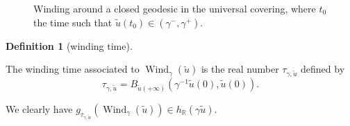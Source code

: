 \documentclass[a4paper,english,reqno]{amsart}
\newcommand{\R}{\mathbb{R}}
\theoremstyle{definition}
\newtheorem{definition}[theorem]{Definition}
\numberwithin{equation}{section}
\begin{document}
	\begin{figure}[htbp]
	\centering
	\begin{normalsize} 
		\def\svgwidth{13cm}
		dessin12.pdf_tex}
	\end{normalsize}
	\caption{Winding around a closed geodesic in the universal covering, where $t_0$ the time such that $\tilde u(t_0)\in (\gamma^-,\gamma^+)$.}
	\label{dessin12}
\end{figure}


\begin{definition}[winding time]\label{def_winding_time}

The winding time associated to $\operatorname{Wind}_\gamma(\tilde u)$ is the real number $\tau_{\gamma,\tilde u}$ defined by
$$
\tau_{\gamma,\tilde u}=B_{\tilde u(+\infty)}(\gamma^{-1}\tilde u(0), \tilde u(0)).
$$

\end{definition}

We clearly have $g_{\tau_{\gamma,\tilde u}}(\operatorname{Wind}_\gamma(\tilde u))\in h_{\R}( \gamma \tilde u)$.
\end{document}
